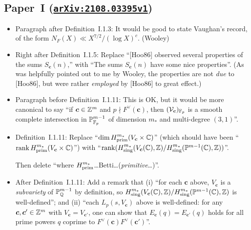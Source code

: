 \documentclass[12pt]{article}
\begin{document}
\subsection{Paper~I (\href{https://arxiv.org/abs/2108.03395v1}{\texttt{arXiv:2108.03395v1}})}

\begin{itemize}
    \item Paragraph after Definition~I.1.3:
    It would be good to state Vaughan's record, of the form $N_F(X)\ll X^{7/2}/(\log{X})^c$.
    (Wooley)
    
    \item Right after Definition~I.1.5:
    Replace ``[Hoo86] observed several properties of the sums $S_{\bm{c}}(n)$,'' with ``The sums $S_{\bm{c}}(n)$ have some nice properties''.
    (As was helpfully pointed out to me by Wooley, the properties are not \emph{due} to [Hoo86], but were rather \emph{employed} by [Hoo86] to great effect.)
    
    \item Paragraph before Definition~I.1.11:
    This is OK,
    but it would be more canonical to say ``if $\bm{c}\in \mathbb{Z}^m$ and $p\nmid F^\vee(\bm{c})$, then $(\mathcal{V}_{\bm{c}})_{\mathbb{F}_p}$ is a smooth complete intersection in $\mathbb{P}^{m-1}_{\mathbb{F}_p}$ of dimension $m_\ast$ and multi-degree $(3,1)$''.
    
    \item Definition~I.1.11:
    Replace ``$\dim H^{m_\ast}_{\operatorname{prim}}(V_{\bm{c}}\times\mathbb{C})$'' (which should have been ``$\operatorname{rank} H^{m_\ast}_{\operatorname{prim}}(V_{\bm{c}}\times\mathbb{C})$'')
    with ``$\operatorname{rank}(H^{m_\ast}_\textnormal{sing}(V_{\bm{c}}(\mathbb{C}),\mathbb{Z})/H^{m_\ast}_\textnormal{sing}(\mathbb{P}^{m-1}(\mathbb{C}),\mathbb{Z}))$''.
    
    Then delete ``where $H^{m_\ast}_{\operatorname{prim}}$\dots Betti\dots (\emph{primitive}\dots)''.
    
    \item After Definition~I.1.11:
    Add a remark that
    (i) ``for each $\bm{c}$ above,
    $V_{\bm{c}}$ is a \emph{subvariety} of $\mathbb{P}^{m-1}_{\mathbb{Q}}$ by definition,
    so $H^{m_\ast}_\textnormal{sing}(V_{\bm{c}}(\mathbb{C}),\mathbb{Z})/H^{m_\ast}_\textnormal{sing}(\mathbb{P}^{m-1}(\mathbb{C}),\mathbb{Z})$ is well-defined'';
    and (ii) ``each $L_p(s,V_{\bm{c}})$ above is well-defined:
    for any $\bm{c},\bm{c}'\in \mathbb{Z}^m$ with $V_{\bm{c}}=V_{\bm{c}'}$,
    one can show that $E_{\bm{c}}(q) = E_{\bm{c}'}(q)$ holds for all prime powers $q$ coprime to $F^\vee(\bm{c})F^\vee(\bm{c}')$''.
    

\end{itemize}
\end{document}
